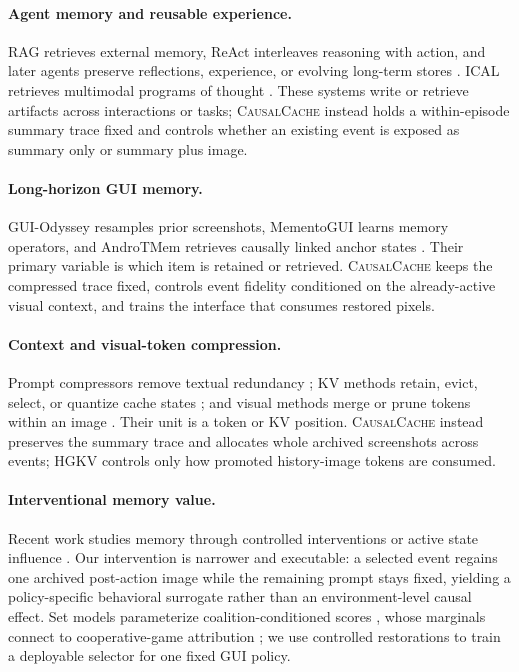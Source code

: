 \documentclass[letterpaper]{article} %
\newcommand{\method}{\textsc{CausalCache}}
\newcommand{\hgkv}{\textsc{HGKV}}
\begin{document}
\paragraph{Agent memory and reusable experience.}
RAG retrieves external memory, ReAct interleaves reasoning with action, and
later agents preserve reflections, experience, or evolving long-term stores
\citep{lewis2020rag,yao2023react,shinn2023reflexion,zhao2024expel,
zhong2024memorybank,gutierrez2024hipporag}. ICAL retrieves multimodal programs
of thought \citep{sarch2024ical}. These systems write or retrieve artifacts
across interactions or tasks; \method{} instead holds a within-episode summary
trace fixed and controls whether an existing event is exposed as summary only
or summary plus image.

\paragraph{Long-horizon GUI memory.}
GUI-Odyssey resamples prior screenshots, MementoGUI learns memory operators,
and AndroTMem retrieves causally linked anchor states
\citep{lu2025guiodyssey,zeng2026mementogui,shi2026androtmem}. Their primary
variable is which item is retained or retrieved. \method{} keeps the compressed
trace fixed, controls event fidelity conditioned on the already-active visual
context, and trains the interface that consumes restored pixels.

\paragraph{Context and visual-token compression.}
Prompt compressors remove textual redundancy
\citep{jiang2023llmlingua,jiang2024longllmlingua,pan2024llmlingua2}; KV methods
retain, evict, select, or quantize cache states
\citep{xiao2024streamingllm,zhang2023h2o,liu2023scissorhands,
li2024snapkv,liu2024kivi,corallo2024finch}; and visual methods merge or prune
tokens within an image \citep{bolya2023tome,chen2024fastv,yang2025visionzip}.
Their unit is a token or KV position. \method{} instead preserves the summary
trace and allocates whole archived screenshots across events; \hgkv{} controls
only how promoted history-image tokens are consumed.

\paragraph{Interventional memory value.}
Recent work studies memory through controlled interventions or active state
influence \citep{srivastava2026cmi,liu2026atmem}. Our intervention is narrower
and executable: a selected event regains one archived post-action image while
the remaining prompt stays fixed, yielding a policy-specific behavioral
surrogate rather than an environment-level causal effect. Set models
parameterize coalition-conditioned scores
\citep{zaheer2017deepsets,lee2019settransformer}, whose marginals connect to
cooperative-game attribution \citep{shapley1953value}; we use controlled
restorations to train a deployable selector for one fixed GUI policy.
\end{document}
